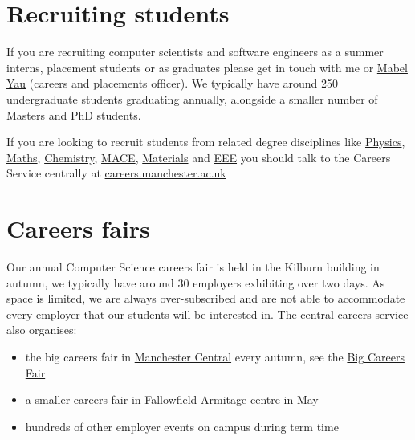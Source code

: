 \documentclass[12pt,]{book}
\providecommand{\tightlist}{%
  \setlength{\itemsep}{0pt}\setlength{\parskip}{0pt}}
\begin{document}
\hypertarget{recruiting-students}{%
\section{Recruiting students}\label{recruiting-students}}

If you are recruiting computer scientists and software engineers as a summer interns, placement students or as graduates please get in touch with me or \href{https://uk.linkedin.com/in/mabel-yau}{Mabel Yau} (careers and placements officer). We typically have around 250 undergraduate students graduating annually, alongside a smaller number of Masters and PhD students.

If you are looking to recruit students from related degree disciplines like \href{https://www.physics.manchester.ac.uk/}{Physics}, \href{https://www.maths.manchester.ac.uk/}{Maths}, \href{https://www.chemistry.manchester.ac.uk/}{Chemistry}, \href{https://www.mace.manchester.ac.uk/}{MACE}, \href{https://www.materials.manchester.ac.uk/}{Materials} and \href{https://www.eee.manchester.ac.uk/}{EEE} you should talk to the Careers Service centrally at \href{http://www.careers.manchester.ac.uk/}{careers.manchester.ac.uk}

\hypertarget{careers-fairs}{%
\section{Careers fairs}\label{careers-fairs}}

Our annual Computer Science careers fair is held in the Kilburn building in autumn, we typically have around 30 employers exhibiting over two days. As space is limited, we are always over-subscribed and are not able to accommodate every employer that our students will be interested in. The central careers service also organises:

\begin{itemize}
\tightlist
\item
  the big careers fair in \href{https://www.manchestercentral.co.uk/}{Manchester Central} every autumn, see the \href{http://www.careers.manchester.ac.uk/events/bigcareersfair/}{Big Careers Fair}
\item
  a smaller careers fair in Fallowfield \href{http://www.sport.manchester.ac.uk/facilities/armitage/}{Armitage centre} in May
\item
  hundreds of other employer events on campus during term time
\end{itemize}
\end{document}
